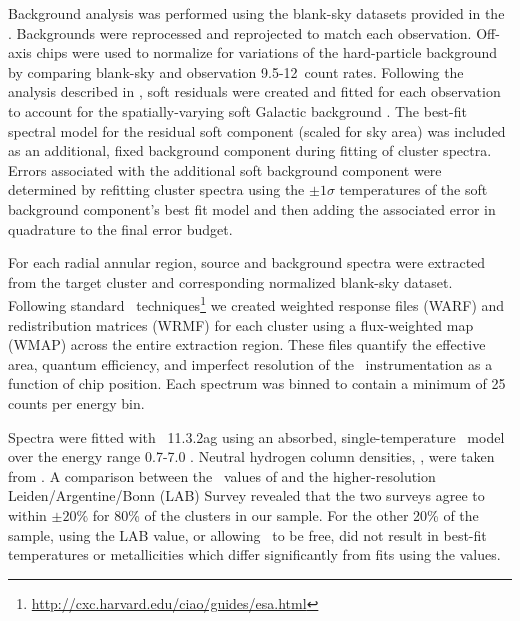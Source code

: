 Background analysis was performed using the blank-sky datasets
provided in the \caldb. Backgrounds were reprocessed and reprojected
to match each observation. Off-axis chips were used to normalize for
variations of the hard-particle background by comparing blank-sky and
observation 9.5-12\keV\ count rates. Following the analysis described
in \citet{2005ApJ...628..655V}, soft residuals were created and fitted
for each observation to account for the spatially-varying soft
Galactic background \citep[see also][]{xrayband}. The best-fit
spectral model for the residual soft component (scaled for sky area)
was included as an additional, fixed background component during
fitting of cluster spectra. Errors associated with the additional soft
background component were determined by refitting cluster spectra
using the $\pm 1\sigma$ temperatures of the soft background
component's best fit model and then adding the associated error in
quadrature to the final error budget.

For each radial annular region, source and background spectra were
extracted from the target cluster and corresponding normalized
blank-sky dataset. Following standard
\ciao\ techniques\footnote{\url{http://cxc.harvard.edu/ciao/guides/esa.html}}
we created weighted response files (WARF) and redistribution matrices
(WRMF) for each cluster using a flux-weighted map (WMAP) across the
entire extraction region. These files quantify the effective area,
quantum efficiency, and imperfect resolution of the
\chandra\ instrumentation as a function of chip position. Each
spectrum was binned to contain a minimum of 25 counts per energy bin.

Spectra were fitted with \xspec\ 11.3.2ag \citep{xspec} using an
absorbed, single-temperature \mekal\ model \citep{mekal1, mekal2} over
the energy range 0.7-7.0 \keV. Neutral hydrogen column densities,
\nhi, were taken from \citet{dickeylockman}. A comparison between the
\nhi\ values of \citet{dickeylockman} and the higher-resolution
Leiden/Argentine/Bonn (LAB) Survey \citep{lab} revealed that the two
surveys agree to within $\pm 20\%$ for 80\% of the clusters in our
sample. For the other 20\% of the sample, using the LAB value, or
allowing \nhi\ to be free, did not result in best-fit temperatures or
metallicities which differ significantly from fits using the
\citet{dickeylockman} values.

